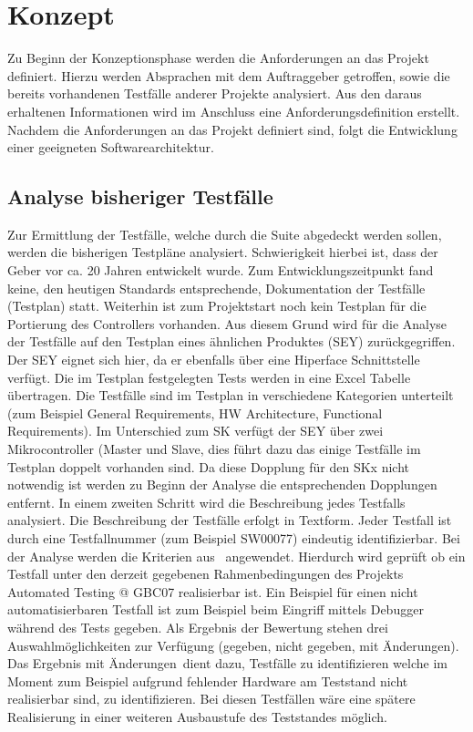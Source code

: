 \onehalfspacing
\section{Konzept}
Zu Beginn der Konzeptionsphase werden die Anforderungen an das Projekt definiert. Hierzu werden Absprachen mit dem Auftraggeber getroffen, sowie die bereits vorhandenen Testfälle anderer Projekte analysiert. Aus den daraus erhaltenen Informationen wird im Anschluss eine Anforderungsdefinition erstellt. Nachdem die Anforderungen an das Projekt definiert sind, folgt die Entwicklung einer geeigneten Softwarearchitektur.
\subsection{Analyse bisheriger Testfälle}
Zur Ermittlung der Testfälle, welche durch die Suite abgedeckt werden sollen, werden die bisherigen Testpläne analysiert. Schwierigkeit hierbei ist, dass der Geber vor ca. 20 Jahren entwickelt wurde. Zum Entwicklungszeitpunkt fand keine, den heutigen Standards entsprechende, Dokumentation der Testfälle (Testplan) statt. Weiterhin ist zum Projektstart noch kein Testplan für die Portierung des Controllers vorhanden. Aus diesem Grund wird für die Analyse der Testfälle auf den Testplan eines ähnlichen Produktes (SEY) zurückgegriffen. Der SEY eignet sich hier, da er ebenfalls über eine Hiperface Schnittstelle verfügt.\newline
Die im Testplan festgelegten Tests werden in eine Excel Tabelle übertragen. Die Testfälle sind im Testplan in verschiedene Kategorien unterteilt (zum Beispiel General Requirements, HW Architecture, Functional Requirements). Im Unterschied zum SK verfügt der SEY über zwei Mikrocontroller (Master und Slave, dies führt dazu das einige Testfälle im Testplan doppelt vorhanden sind. Da diese Dopplung für den SKx nicht notwendig ist werden zu Beginn der Analyse die entsprechenden Dopplungen entfernt. In einem zweiten Schritt wird die Beschreibung jedes Testfalls analysiert. Die Beschreibung der Testfälle erfolgt in Textform. Jeder Testfall ist durch eine Testfallnummer (zum Beispiel SW00077) eindeutig identifizierbar. Bei der Analyse werden die Kriterien aus \dq {}\dq~angewendet. Hierdurch wird geprüft ob ein Testfall unter den derzeit gegebenen Rahmenbedingungen des Projekts Automated Testing @ GBC07  realisierbar ist. Ein Beispiel für einen nicht automatisierbaren Testfall ist zum Beispiel beim Eingriff mittels Debugger während des Tests gegeben. Als Ergebnis der Bewertung stehen drei Auswahlmöglichkeiten zur Verfügung (gegeben, nicht gegeben, mit Änderungen). Das Ergebnis \dq mit Änderungen\dq~dient dazu, Testfälle zu identifizieren welche im Moment zum Beispiel aufgrund fehlender Hardware am Teststand nicht realisierbar sind, zu identifizieren. Bei diesen Testfällen wäre eine spätere Realisierung in einer weiteren Ausbaustufe des Teststandes möglich.

